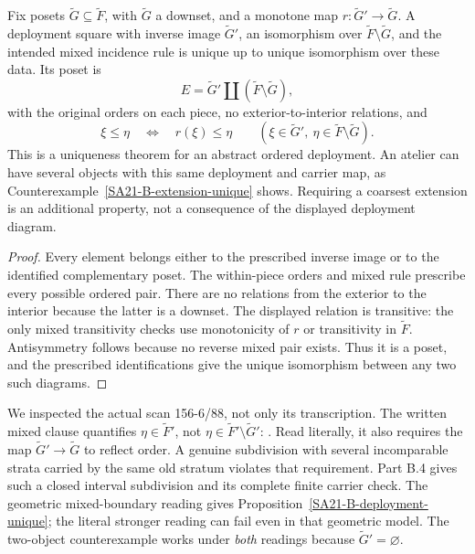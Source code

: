 \begin{proposition}
\label{SA21-B-deployment-unique}
Fix posets \(\widetilde G\subseteq\widetilde F\), with
\(\widetilde G\) a downset, and a monotone map
\(r:\widetilde G'\to\widetilde G\). A deployment square with
inverse image \(\widetilde G'\), an isomorphism over
\(\widetilde F\setminus\widetilde G\), and the intended mixed
incidence rule is unique up to unique isomorphism over these data.
Its poset is
\[
 E=\widetilde G'\amalg(\widetilde F\setminus\widetilde G),
\]
with the original orders on each piece, no exterior-to-interior
relations, and
\[
 \xi\leq\eta\quad\Longleftrightarrow\quad
 r(\xi)\leq\eta
 \qquad(\xi\in\widetilde G',\ 
        \eta\in\widetilde F\setminus\widetilde G).
\]
This is a uniqueness theorem for an abstract ordered deployment.
An atelier can have several objects with this same deployment and
carrier map, as Counterexample~\ref{SA21-B-extension-unique} shows.
Requiring a coarsest extension is an additional property, not a
consequence of the displayed deployment diagram.
\end{proposition}

\begin{proof}
Every element belongs either to the prescribed inverse image or to
the identified complementary poset. The within-piece orders and
mixed rule prescribe every possible ordered pair. There are no
relations from the exterior to the interior because the latter is
a downset. The displayed relation is transitive: the only mixed
transitivity checks use monotonicity of \(r\) or transitivity in
\(\widetilde F\). Antisymmetry follows because no reverse mixed
pair exists. Thus it is a poset, and the prescribed identifications
give the unique isomorphism between any two such diagrams.
\end{proof}

We inspected the actual scan 156-6/88, not only its transcription.
The written mixed clause quantifies \(\eta\in\widetilde F'\), not
\(\eta\in\widetilde F'\setminus\widetilde G'\):
.
Read literally, it also requires the map
\(\widetilde G'\to\widetilde G\) to reflect order. A genuine
subdivision with several incomparable strata carried by the same
old stratum violates that requirement. Part B.4 gives such a closed
interval subdivision and its complete finite carrier check.
The geometric mixed-boundary reading gives
Proposition~\ref{SA21-B-deployment-unique}; the literal stronger
reading can fail even in that geometric model. The two-object
counterexample works under \emph{both} readings because
\(\widetilde G'=\varnothing\).

